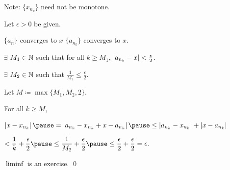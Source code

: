 \documentclass[10pt,aspectratio=149]{beamer}
\begin{document}
\begin{frame}

Note: $\{ x_{n_k} \}$ need not be monotone.

\pause
\medskip

Let $\epsilon > 0$ be given.

\pause
\medskip

$\{ a_n \}$ converges to $x$ \wthus $\{ a_{n_k} \}$ converges to $x$.

\pause
\medskip

$\exists$ $M_1 \in {\mathbb{N}}$ such that for all $k \geq M_1$, \quad
$\left\lvert {a_{n_k} - x} \right\rvert < \frac{\epsilon}{2}$.

\pause
\medskip

$\exists$ $M_2 \in {\mathbb{N}}$ such that 
\quad $\displaystyle \frac{1}{M_2} \leq \frac{\epsilon}{2}$.

\pause
\medskip

Let $M \coloneqq \max \{M_1 , M_2 , 2 \}$.

\pause
\medskip

For all $k \geq M$,

\medskip

$\displaystyle
\abs{x- x_{n_k}}
\pause
=
\abs{a_{n_k} - x_{n_k} + x - a_{n_k}}
\pause
\leq
\abs{a_{n_k} - x_{n_k}} + \abs{x - a_{n_k}}$

\pause
\medskip

\qquad
$\displaystyle
< \frac{1}{k} + \frac{\epsilon}{2}
\pause
\leq \frac{1}{M_2} + \frac{\epsilon}{2}
\pause
\leq \frac{\epsilon}{2} +
\frac{\epsilon}{2} = \epsilon$.

\pause
\medskip

$\liminf$ is an exercise.
\qed

\end{frame}
\end{document}
